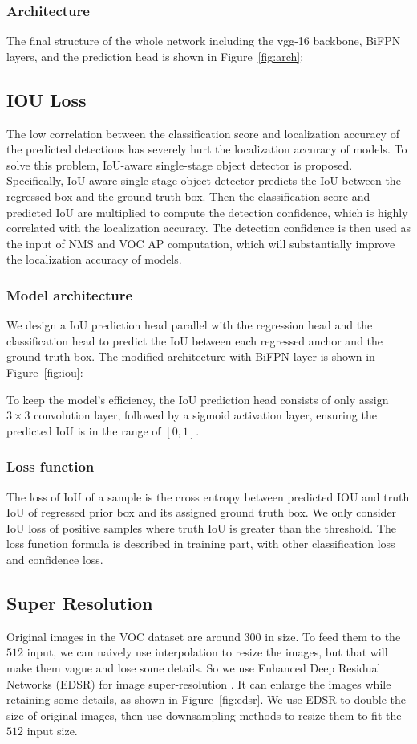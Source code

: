 \documentclass[journal,conference]{IEEEtran}
\begin{document}
\subsubsection{Architecture}
The final structure of the whole network including the vgg-16 backbone, BiFPN layers, and the prediction head is shown in Figure~\ref{fig:arch}:


\subsection{IOU Loss}
The low correlation between the classification score and localization accuracy of the predicted detections has severely hurt the localization accuracy of models. To solve this problem, IoU-aware single-stage object detector is proposed. Specifically, IoU-aware single-stage object detector predicts the IoU between the regressed box and the ground truth box. Then the classification score and predicted IoU are multiplied to compute the detection confidence, which is highly correlated with the localization accuracy. The detection confidence is then used as the input of NMS and VOC AP computation, which will substantially improve the localization accuracy of models.

\subsubsection{Model architecture}
We design a IoU prediction head parallel with the regression head and the classification head to predict the IoU between each regressed anchor and the ground truth box. The modified architecture with BiFPN layer is shown in Figure~\ref{fig:iou}:

To keep the model's efficiency, the IoU prediction head consists of only assign $3\times 3$ convolution layer, followed by a sigmoid activation layer, ensuring the predicted IoU is in the range of $[0, 1]$.

\subsubsection{Loss function}
The loss of IoU of a sample is the cross entropy between predicted IOU and truth IoU of regressed prior box and its assigned ground truth box. We only consider IoU loss of positive samples where truth IoU is greater than the threshold. The loss function formula is described in training part, with other classification loss and confidence loss.

\subsection{Super Resolution}
Original images in the VOC dataset are around $300$ in size. To feed them to the $512$ input, we can naively use interpolation to resize the images, but that will make them vague and lose some details. So we use Enhanced Deep Residual Networks (EDSR) for image super-resolution \cite{edsr}. It can enlarge the images while retaining some details, as shown in Figure~\ref{fig:edsr}. We use EDSR to double the size of original images, then use downsampling methods to resize them to fit the $512$ input size.
\end{document}
